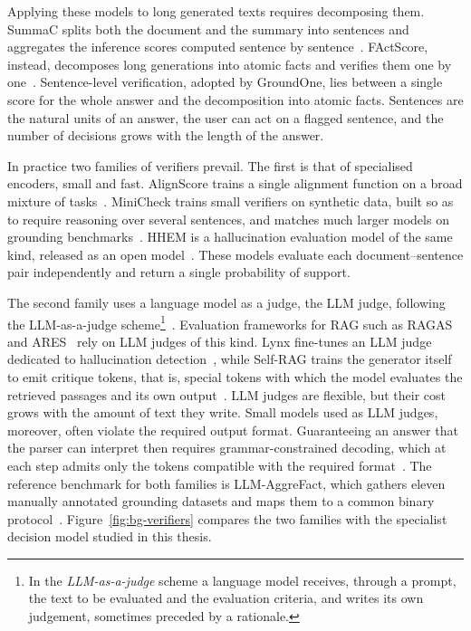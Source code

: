 Applying these models to long generated texts requires decomposing them. SummaC splits both the document and the summary
into sentences and aggregates the inference scores computed sentence by sentence~\cite{laban2022summac}. FActScore,
instead, decomposes long generations into atomic facts and verifies them one by one~\cite{min2023factscore}.
Sentence-level verification, adopted by GroundOne, lies between a single score for the whole answer and the
decomposition into atomic facts. Sentences are the natural units of an answer, the user can act on a flagged sentence,
and the number of decisions grows with the length of the answer.

In practice two families of verifiers prevail. The first is that of specialised encoders, small and fast. AlignScore
trains a single alignment function on a broad mixture of tasks~\cite{zha2023alignscore}. MiniCheck trains small
verifiers on synthetic data, built so as to require reasoning over several sentences, and matches much larger models on
grounding benchmarks~\cite{tang2024minicheck}. HHEM is a hallucination evaluation model of the same kind, released as an
open model~\cite{vectara2024hhem}. These models evaluate each document--sentence pair independently and return a single
probability of support.

The second family uses a language model as a judge, the LLM judge, following the LLM-as-a-judge
scheme\footnote{In the \emph{LLM-as-a-judge} scheme a language model receives, through a prompt, the text to be
evaluated and the evaluation criteria, and writes its own judgement, sometimes preceded by a rationale.}~\cite{zheng2023judging}.
Evaluation frameworks for RAG such as RAGAS~\cite{es2024ragas} and ARES~\cite{saadfalcon2024ares} rely on LLM judges of this
kind. Lynx fine-tunes an LLM judge dedicated to hallucination detection~\cite{ravi2024lynx}, while Self-RAG trains the
generator itself to emit critique tokens, that is, special tokens with which the model evaluates the retrieved passages
and its own output~\cite{asai2024selfrag}. LLM judges are flexible, but their cost grows with the amount of text they write.
Small models used as LLM judges, moreover, often violate the required output format. Guaranteeing an answer that the parser
can interpret then requires grammar-constrained decoding, which at each step admits only the tokens compatible with the
required format~\cite{willard2023outlines}. The reference benchmark for both families is LLM-AggreFact, which gathers
eleven manually annotated grounding datasets and maps them to a common binary
protocol~\cite{tang2024minicheck,llmaggrefact}. Figure~\ref{fig:bg-verifiers} compares the two families with the
specialist decision model studied in this thesis.

